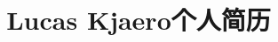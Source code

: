\documentclass[margin]{res}
\title{Lucas Kjaero个人简历}
\begin{document}


\address{电话号码：+45 42 59 80 50\\永久住址： Copenhagen, Denmark}
\address{邮箱地址：\href{mailto:lucas@lucaskjaerozhang.com}{Lucas@LucasKjaeroZhang.com}\\个人网址：\href{https://www.lucaskjaerozhang.com}{www.LucasKjaeroZhang.com}}

\end{document}
